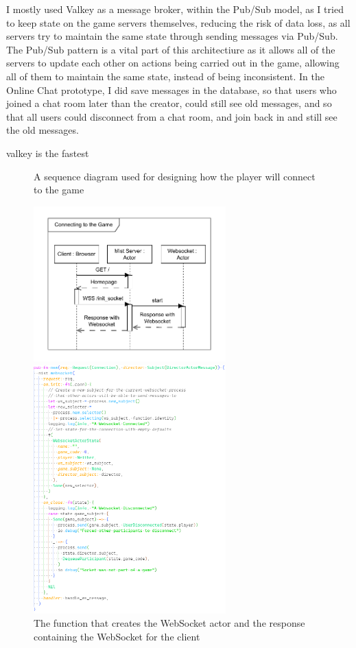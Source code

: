 \documentclass[]{project_interim}
\begin{document}
I mostly used Valkey as a message broker, within the Pub/Sub model, as I
tried to keep state on the game servers themselves, reducing the risk of data
loss, as all servers try to maintain the same state through sending messages
via Pub/Sub. The Pub/Sub pattern is a vital part of this architectiure as it
allows all of the servers to update each other on actions being carried out
in the game, allowing all of them to maintain the same state,
instead of being inconsistent. In the Online Chat prototype,
I did save messages in the database, so that users who joined
a chat room later than the creator, could still see old messages, and so that all
users could disconnect from a chat room, and join back in and still see the old
messages.


valkey is the fastest

\newpage

\begin{figure}
  \caption{A sequence diagram used for designing how the player will connect to the game}\label{wrap-fig:1}
  \includegraphics[width=20em]{sequence_connecting}
  \caption{The function that creates the WebSocket actor and the response containing the WebSocket for the client}\label{wrap-fig:2}
  \vspace*{0.5cm}
  \includegraphics[width=20em]{new_websocket_actor}
\end{figure}
\end{document}

